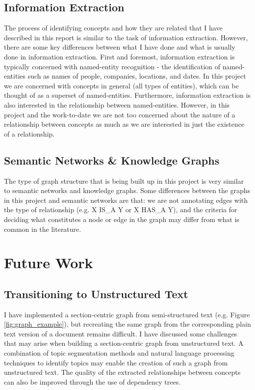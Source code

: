 \documentclass[12pt]{article}
\begin{document}
\subsection{Information Extraction}
The process of identifying concepts and how they are related that I have described in this report is similar to the task of information extraction. However, there are some key differences between what I have done and what is usually done in information extraction. First and foremost, information extraction is typically concerned with named-entity recognition - the identification of named-entities such as names of people, companies, locations, and dates. In this project we are concerned with concepts in general (all types of entities), which can be thought of as a superset of named-entities. Furthermore, information extraction is also interested in the relationship between named-entities. However, in this project and the work-to-date we are not too concerned about the nature of a relationship between concepts as much as we are interested in just the existence of a relationship.

\subsection{Semantic Networks \& Knowledge Graphs}
The type of graph structure that is being built up in this project is very similar to semantic networks and knowledge graphs. Some differences between the graphs in this project and semantic networks are that: we are not annotating edges with the type of relationship (e.g. X IS\_A Y or X HAS\_A Y), and the criteria for deciding what constitutes a node or edge in the graph may differ from what is common in the literature. 

\section{Future Work} \label{sec:future_work}
\subsection{Transitioning to Unstructured Text}
I have implemented a section-centric graph from semi-structured text (e.g. Figure \ref{fig:graph_example}), but recreating the same graph from the corresponding plain text version of a document remains difficult. I have discussed some challenges that may arise when building a section-centric graph from unstructured text. A combination of topic segmentation methods and natural language processing techniques to identify topics may enable the creation of such a graph from unstructured text. The quality of the extracted relationships between concepts can also be improved through the use of dependency trees.
\end{document}
